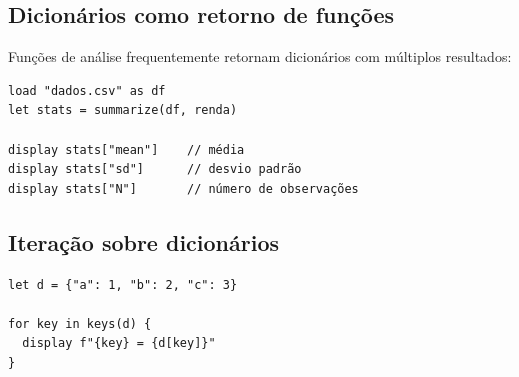\subsection{Dicionários como retorno de funções}

Funções de análise frequentemente retornam dicionários com múltiplos resultados:

\begin{lstlisting}[caption={summarize retorna dicionário}]
load "dados.csv" as df
let stats = summarize(df, renda)

display stats["mean"]    // média
display stats["sd"]      // desvio padrão
display stats["N"]       // número de observações
\end{lstlisting}

\subsection{Iteração sobre dicionários}

\begin{lstlisting}
let d = {"a": 1, "b": 2, "c": 3}

for key in keys(d) {
  display f"{key} = {d[key]}"
}
\end{lstlisting}
